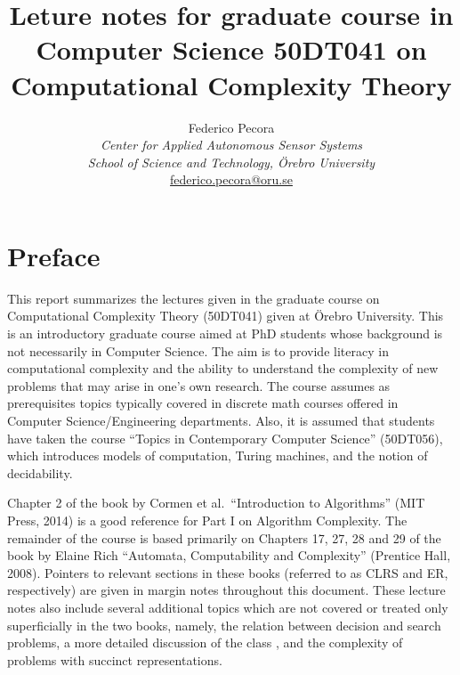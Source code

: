 \documentclass[a4paper]{report}
\theoremstyle{definition}
\begin{document}
\title{\large{Leture notes for graduate course in Computer Science 50DT041 on}\\\vspace{0.1cm}\huge{{\bf Computational Complexity Theory}}}
\author{Federico Pecora\vspace{0.3cm}\\{\em Center for Applied Autonomous Sensor Systems}\\{\em School of Science and Technology, \"Orebro University}\vspace{0.3cm}\\\url{federico.pecora@oru.se}}

\date{}

\maketitle

\section*{Preface}
This report summarizes the lectures given in the graduate course on Computational Complexity Theory (50DT041) given at \"Orebro University. This is an introductory graduate course aimed at PhD students whose background is not necessarily in Computer Science. The aim is to provide literacy in computational complexity and the ability to understand the complexity of new problems that may arise in one's own research. The course assumes as prerequisites topics typically covered in discrete math courses offered in Computer Science/Engineering departments. Also, it is assumed that students have taken the course ``Topics in Contemporary Computer Science'' (50DT056), which introduces models of computation, Turing machines, and the notion of decidability.

Chapter 2 of the book by Cormen et al.~``Introduction to Algorithms'' (MIT Press, 2014) is a good reference for Part I on Algorithm Complexity. The remainder of the course is based primarily on Chapters 17, 27, 28 and 29 of the book by Elaine Rich ``Automata, Computability and Complexity'' (Prentice Hall, 2008). Pointers to relevant sections in these books (referred to as CLRS and ER, respectively) are given in margin notes throughout this document. These lecture notes also include several additional topics which are not covered or treated only superficially in the two books, namely, the relation between decision and search problems, a more detailed discussion of the class \coNP{}, and the complexity of problems with succinct representations.
\nocite{Cormen:2009:IAT:1614191,rich2008automata}
\end{document}
